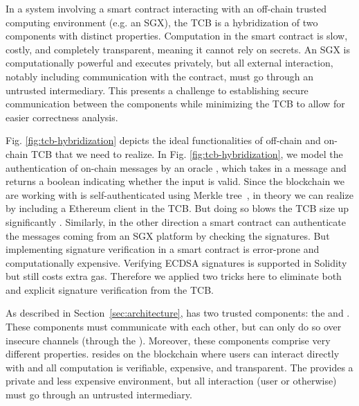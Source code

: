 In a system involving a smart contract interacting with an off-chain trusted computing environment (e.g. an SGX),
the TCB is a hybridization of two components with distinct properties.
Computation in the smart contract is slow, costly, and completely transparent, meaning it cannot rely on secrets.
An SGX is computationally powerful and executes privately, but all external interaction, notably including communication with the contract, must go through an untrusted intermediary.
This presents a challenge to establishing secure communication between the components while minimizing the TCB to allow for easier correctness analysis.


Fig. \ref{fig:tcb-hybridization} depicts the
ideal functionalities of off-chain and on-chain TCB that we need to realize.
In Fig. \ref{fig:tcb-hybridization}, we model the authentication of on-chain
messages by an oracle \oauth, which takes in a message
and returns a boolean indicating whether the input is valid.
Since the blockchain we are working with is self-authenticated using Merkle
tree~, in theory we can realize \oauth
by including a Ethereum client in the TCB. But doing so blows the TCB size up 
significantly .
Similarly, in the other direction a smart contract can
authenticate the messages coming from an SGX platform by checking the
signatures. But implementing
signature verification in a smart contract is error-prone and 
computationally expensive. Verifying ECDSA signatures
is supported in Solidity  but still costs extra gas.
Therefore we applied two tricks here to eliminate both \oauth
and explicit signature verification from the TCB.


\iffalse
As described in Section~\ref{sec:architecture}, \tc has two trusted components: the \encname and \tcont.
These components must communicate with each other, but can only do so over insecure channels (through the \medname).
Moreover, these components comprise very different properties.
\tcont resides on the blockchain where users can interact directly with \tc and all computation is verifiable, expensive, and transparent.
The \encname provides a private and less expensive environment, but all interaction (user or otherwise) must go through an untrusted intermediary.

